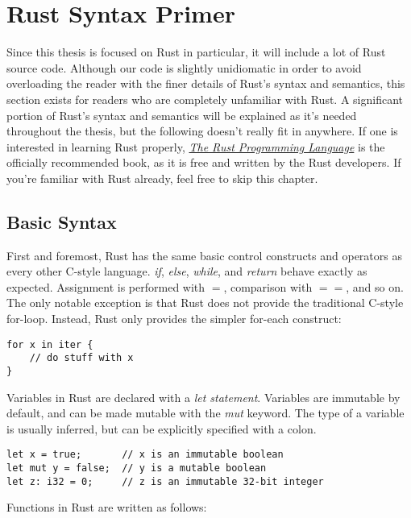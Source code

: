 \chapter{Rust Syntax Primer}
\label{ch:syntax}

Since this thesis is focused on Rust in particular, it will include a lot of
Rust source code. Although our code is slightly unidiomatic
in order to avoid overloading the reader with the finer details of Rust's syntax
and semantics, this section exists for readers who are completely unfamiliar
with Rust. A significant portion of Rust's syntax and semantics will be
explained as it's needed throughout the thesis, but the following doesn't
really fit in anywhere. If one is interested in learning Rust properly,
\href{https://doc.rust-lang.org/book/}{\emph{The Rust Programming Language}}
is the officially recommended book, as it is free and written by the Rust developers.
If you're familiar with Rust already, feel free to skip this chapter.



\section{Basic Syntax}

First and foremost, Rust has the same basic control constructs and operators
as every other C-style language. \emph{if}, \emph{else}, \emph{while}, and
\emph{return} behave exactly as expected. Assignment is performed with $=$,
comparison with $==$, and so on. The only notable exception is that Rust does
not provide the traditional C-style for-loop. Instead, Rust only provides the
simpler for-each construct:

\begin{verbatim}
for x in iter {
    // do stuff with x
}
\end{verbatim}

Variables in Rust are declared with a \emph{let statement}. Variables are
immutable by default, and can be made mutable with the \emph{mut}
keyword. The type of a variable is usually inferred, but can be explicitly
specified with a colon.

\begin{verbatim}
let x = true;       // x is an immutable boolean
let mut y = false;  // y is a mutable boolean
let z: i32 = 0;     // z is an immutable 32-bit integer
\end{verbatim}

Functions in Rust are written as follows:


